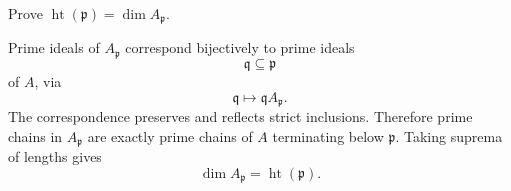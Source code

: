 \begin{problem}\label{prob:vi29-07}
Prove \(\operatorname{ht}(\mathfrak p)=\dim A_{\mathfrak p}\).

\end{problem}

\ifdefined\FullProblemDossiers
\begin{solution}
Prime ideals of \(A_{\mathfrak p}\) correspond bijectively to prime ideals
\[
\mathfrak q\subseteq\mathfrak p
\]
of \(A\), via
\[
\mathfrak q\longmapsto\mathfrak q A_{\mathfrak p}.
\]
The correspondence preserves and reflects strict inclusions.  Therefore prime chains in \(A_{\mathfrak p}\) are
exactly prime chains of \(A\) terminating below \(\mathfrak p\).  Taking suprema of lengths gives
\[
\boxed{\dim A_{\mathfrak p}=\operatorname{ht}(\mathfrak p)}.
\]
\end{solution}
\fi
